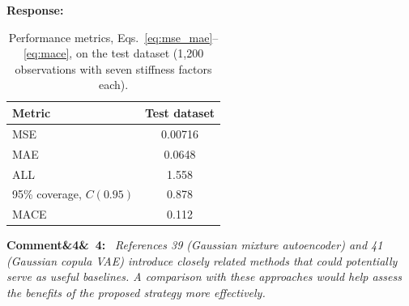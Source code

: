 \documentclass[11pt]{article}
\newenvironment{rcomment}[1]{\par\bigskip\noindent\textbf{Comment\ifx&#1&\else\ #1\fi:}\ \itshape}{\par}
\newenvironment{response}{\par\smallskip\noindent\color{resp}\textbf{Response:}\ }{\par}
\begin{document}
\begin{response}
	\begin{table}[H]
		\centering\small
		\caption{Performance metrics, Eqs.~\eqref{eq:mse_mae}--\eqref{eq:mace}, on the test dataset (1,200 observations with seven stiffness factors each).}
		\label{tab:metricsB}
		\begin{tabular}{lc}
			\toprule
			Metric & Test dataset \\
			\midrule
			MSE & 0.00716 \\
			MAE & 0.0648 \\
			ALL & 1.558 \\
			95\% coverage, $C(0.95)$ & 0.878 \\
			MACE & 0.112 \\
			\bottomrule
		\end{tabular}
	\end{table}
\end{response}


%

\begin{rcomment}{4}
References 39 (Gaussian mixture autoencoder) and 41 (Gaussian copula VAE) introduce closely related methods that could
potentially serve as useful baselines. A comparison with these approaches would help assess the benefits of the proposed
strategy more effectively.
\end{rcomment}
\end{document}
